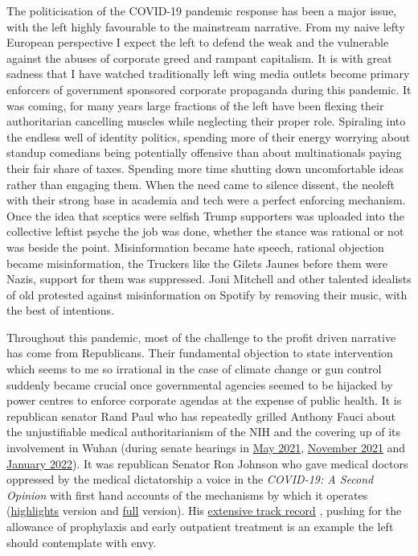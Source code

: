 \documentclass[11pt,a4paper,notitlepage]{report}
\begin{document}
The politicisation of the COVID-19 pandemic response has been a major issue, with the left highly favourable to the mainstream narrative. From my naive lefty European perspective I expect the left to defend the weak and the vulnerable against the abuses of corporate greed and rampant capitalism. It is with great sadness that I have watched traditionally left wing media outlets become primary enforcers of government sponsored corporate propaganda during this pandemic. It was coming, for many years large fractions of the left have been flexing their authoritarian cancelling muscles while neglecting their proper role. Spiraling into the endless well of identity politics, spending more of their energy worrying about standup comedians being potentially offensive than about multinationals paying their fair share of taxes. Spending more time shutting down uncomfortable ideas rather than engaging them. When the need came to silence dissent, the neoleft with their strong base in academia and tech were a perfect enforcing mechanism. Once the idea that sceptics were selfish Trump supporters was uploaded into the collective leftist psyche the job was done, whether the stance was rational or not was beside the point. Misinformation became hate speech, rational objection became misinformation, the Truckers like the Gilets Jaunes before them were Nazis, support for them was suppressed. Joni Mitchell and other talented idealists of old protested against misinformation on Spotify by removing their music, with the best of intentions. 

Throughout this pandemic, most of the challenge to the profit driven narrative has come from Republicans. Their fundamental objection to state intervention which seems to me so irrational in the case of climate change or gun control suddenly became crucial once governmental agencies seemed to be hijacked by power centres to enforce corporate agendas at the expense of public health. It is republican senator Rand Paul who has repeatedly grilled Anthony Fauci about the unjustifiable medical authoritarianism of the NIH and the covering up of its involvement in Wuhan (during senate hearings in \href{https://www.youtube.com/watch?v=2MndwrOzDvo}{May 2021}, \href{https://www.youtube.com/watch?v=JBqXYpO1QpE}{November 2021} and \href{https://www.youtube.com/watch?v=kz7OGxb9X6E}{January 2022}). It was republican Senator Ron Johnson who gave medical doctors oppressed by the medical dictatorship a voice in the \textit{COVID-19: A Second Opinion} with first hand accounts of the mechanisms by which it operates (\href{https://www.youtube.com/watch?v=9jMONZMuS2U}{highlights} version and \href{https://rumble.com/vt62y6-covid-19-a-second-opinion.html}{full} version). His \href{https://www.ronjohnson.senate.gov/covid}{extensive track record} \cite{senator-ron-johnson}, pushing for the allowance of prophylaxis and early outpatient treatment is an example the left should contemplate with envy.
\end{document}
